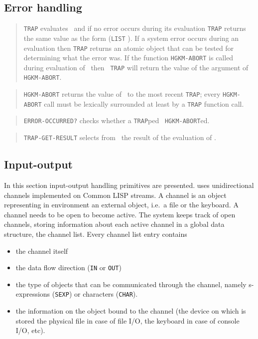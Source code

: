 \subsection{Error handling}

\begin{quote}
	{\tt TRAP} evaluates \form\ and if no error occurs during its evaluation
	{\tt TRAP} returns the same value as the form ({\tt LIST} \form).
	If a system error occurs during an evaluation then {\tt TRAP} returns an
	atomic object that can be tested for determining what the error was.
	If the function {\tt HGKM-ABORT} is called during evaluation of \form\ then {\tt
	TRAP} will return the value of the argument of {\tt HGKM-ABORT}.
\end{quote}

\begin{quote}
	{\tt HGKM-ABORT} returns the value of \form\ to the most recent {\tt TRAP}; every
	{\tt HGKM-ABORT} call must be lexically surrounded at least by a {\tt TRAP}
	function call.
\end{quote}

\begin{quote}
	{\tt ERROR-OCCURRED?} checks whether a {\tt TRAP}ped \form\ {\tt HGKM-ABORT}ed.
\end{quote}

\begin{quote}
	{\tt TRAP-GET-RESULT} selects from \value\ the result of the evaluation of
	\form.
\end{quote}


\subsection{Input-output}

In this section {\HG} input-output handling primitives are presented.
{\HG} uses unidirectional channels implemented on Common LISP streams.
A channel is an object representing in {\HG} environment an external object,
i.e.\ a file or the keyboard.
A channel needs to be open to become active.
The system keeps track of open channels, storing information about each active
channel in a global data structure, the channel list.
Every channel list entry contains
%
\begin{itemize}
	\item
		the channel itself
	\item
		the data flow direction ({\tt IN} or {\tt OUT})
	\item
		the type of objects that can be communicated through the channel, namely
		s-expressions ({\tt SEXP}) or characters ({\tt CHAR}).
	\item
		the information on the object bound to the channel (the device on which
		is stored the physical file in case of file I/O, the keyboard in case of
		console I/O, etc).
\end{itemize}


